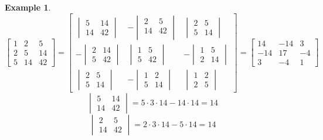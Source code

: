 \documentclass[a4paper,landscape,twocolumn]{article}
\theoremstyle{definition}
\newtheorem{ex}{Example}
\begin{document}
\begin{ex}
  \[
    \begin{bmatrix}
      1 & 2 & 5 \\
      2 & 5 & 14 \\
      5 & 14 & 42
    \end{bmatrix}
    =
    \begin{bmatrix}
      \begin{vmatrix}
        5 & 14 \\
        14 & 42
      \end{vmatrix} &
      - \begin{vmatrix}
        2 & 5 \\
        14 & 42 \\
      \end{vmatrix} &
      \begin{vmatrix}
        2 & 5 \\
        5 & 14
      \end{vmatrix} \\
      -\begin{vmatrix}
        2 & 14 \\
        5 & 42
      \end{vmatrix} &
      \begin{vmatrix}
        1 & 5 \\
        5 & 42
      \end{vmatrix} &
      -\begin{vmatrix}
        1 & 5 \\
        2 & 14
      \end{vmatrix} \\
      \begin{vmatrix}
        2 & 5 \\
        5 & 14
      \end{vmatrix} &
      -\begin{vmatrix}
        1 & 2 \\
        5 & 14
      \end{vmatrix} &
      \begin{vmatrix}
        1 & 2 \\
        2 & 5
      \end{vmatrix}
    \end{bmatrix}
    = \begin{bmatrix}
      14 & -14 & 3 \\
      -14 & 17 & -4 \\
      3 & -4 & 1
    \end{bmatrix}
  \] \[
    \begin{vmatrix}
      5 & 14 \\
      14 & 42
    \end{vmatrix}
    = 5 \cdot 3 \cdot 14
    - 14 \cdot 14 = 14
  \] \[
    \begin{vmatrix}
      2 & 5 \\
      14 & 42
    \end{vmatrix}
    = 2 \cdot 3 \cdot 14
    - 5 \cdot 14 = 14
  \]
\end{ex}
\end{document}
